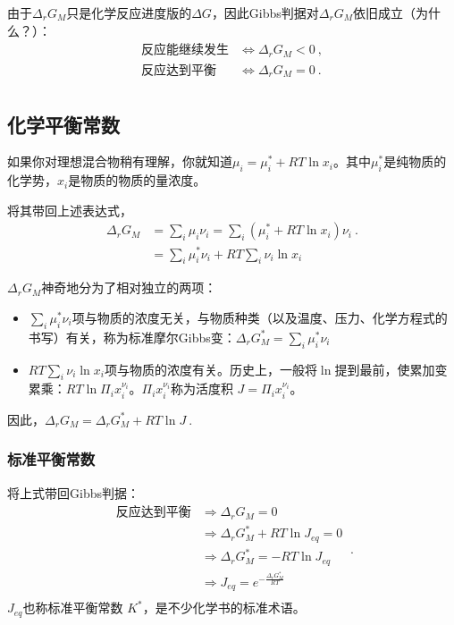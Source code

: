 由于$\Delta_r G_M$只是化学反应进度版的$\Delta G$，因此Gibbs判据对$\Delta_r G_M$依旧成立（为什么？）：
$$
\begin{aligned}
\text{反应能继续发生} &\Longleftrightarrow \Delta_r G_M < 0~,\\
\text{反应达到平衡} &\Longleftrightarrow \Delta_r G_M = 0~.\\
\end{aligned}
$$

\subsection{化学平衡常数}
如果你对理想混合物稍有理解，你就知道$\mu_i = \mu_i^* + RT \ln x_i$。其中$\mu_i^*$是纯物质的化学势，$x_i$是物质的物质的量浓度。

将其带回上述表达式，
$$
\begin{aligned}
\Delta_r G_M &= \sum_i \mu_i \nu_i = \sum_i (\mu_i^* + RT \ln x_i) \nu_i ~.\\
&= \sum_i \mu_i^* \nu_i + RT \sum_i \nu_i \ln x_i
\end{aligned}
$$

$\Delta_r G_M$神奇地分为了相对独立的两项：
\begin{itemize}
\item $\sum_i \mu_i^* \nu_i$项与物质的浓度无关，与物质种类（以及温度、压力、化学方程式的书写）有关，称为标准摩尔Gibbs变：$\Delta_r G_M^* = \sum_i \mu_i^* \nu_i$
\item $RT \sum_i \nu_i \ln x_i$项与物质的浓度有关。历史上，一般将$\ln$提到最前，使累加变累乘：$RT \ln \Pi_i x_i^{\nu_i}$。$\Pi_i x_i^{\nu_i}$称为活度积 $J=\Pi_i x_i^{\nu_i}$。
\end{itemize}
因此，$\Delta_r G_M = \Delta_r G_M^* + RT \ln J~.$

\subsubsection{标准平衡常数}
将上式带回Gibbs判据：
$$
\begin{aligned}
\text{反应达到平衡} &\Rightarrow \Delta_r G_M = 0\\
&\Rightarrow \Delta_r G_M^* + RT \ln J_{eq} = 0\\
&\Rightarrow \Delta_r G_M^* = - RT \ln J_{eq}\\
&\Rightarrow J_{eq} = e^{-\frac{\Delta_r G_M^*}{RT}}\\
\end{aligned}~.
$$
$J_{eq}$也称标准平衡常数 $K^*$，是不少化学书的标准术语。

